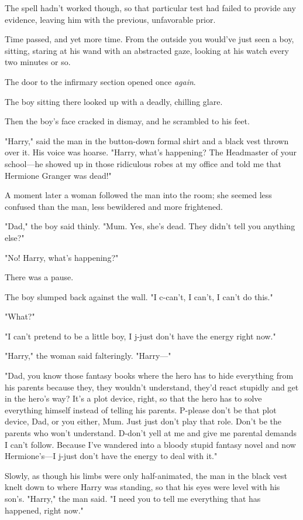 The spell hadn't worked though, so that particular test had failed to provide
any evidence, leaving him with the previous, unfavorable prior.

Time passed, and yet more time. From the outside you would've just seen a boy,
sitting, staring at his wand with an abstracted gaze, looking at his watch
every two minutes or so.

The door to the infirmary section opened once \emph{again}.

The boy sitting there looked up with a deadly, chilling glare.

Then the boy's face cracked in dismay, and he scrambled to his feet.

"Harry," said the man in the button-down formal shirt and a black vest thrown
over it. His voice was hoarse. "Harry, what's happening? The Headmaster of your
school---he showed up in those ridiculous robes at my office and told me that
Hermione Granger was dead!"

A moment later a woman followed the man into the room; she seemed less confused
than the man, less bewildered and more frightened.

"Dad," the boy said thinly. "Mum. Yes, she's dead. They didn't tell you
anything else?"

"No! Harry, what's happening?"

There was a pause.

The boy slumped back against the wall. "I c-can't, I can't, I can't do this."

"What?"

"I can't pretend to be a little boy, I j-just don't have the energy right now."

"Harry," the woman said falteringly. "Harry\mbox{---}"

"Dad, you know those fantasy books where the hero has to hide everything from
his parents because they, they wouldn't understand, they'd react stupidly and
get in the hero's way? It's a plot device, right, so that the hero has to solve
everything himself instead of telling his parents. P-please don't be that plot
device, Dad, or you either, Mum. Just{\el} just don't play that role. Don't
be the parents who won't understand. D-don't yell at me and give me parental
demands I can't follow. Because I've wandered into a bloody stupid fantasy
novel and now Hermione's---I j-just don't have the energy to deal with it."

Slowly, as though his limbs were only half-animated, the man in the black vest
knelt down to where Harry was standing, so that his eyes were level with his
son's. "Harry," the man said. "I need you to tell me everything that has
happened, right now."

